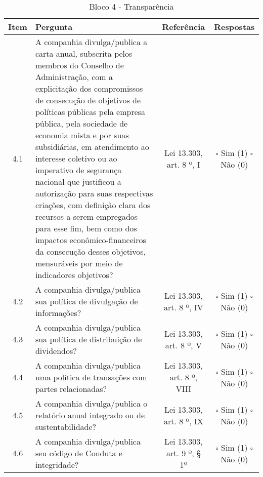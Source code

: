 \begin{center}
\begin{longtable}{c l c c}
\caption{Bloco 4 - Transparência} \label{tab:bloco3} \\
\hline
 Item & Pergunta & Referência & Respostas \\ 
 \hline
4.1 &\parbox[t]{8cm}{A companhia divulga/publica a carta anual, subscrita pelos membros do Conselho de Administração, com a explicitação dos compromissos de consecução de objetivos de políticas públicas pela empresa pública, pela sociedade de economia mista e por suas subsidiárias, em atendimento ao interesse coletivo ou ao imperativo de segurança nacional que justificou a autorização para suas respectivas criações, com definição clara dos recursos a serem empregados para esse fim, bem como dos impactos econômico-financeiros da consecução desses objetivos, mensuráveis por meio de indicadores objetivos?} & \parbox[t]{2cm}{Lei 13.303, art. 8 º, I} & \parbox[t]{2cm}{$\square$ Sim (1) \\ $\square$ Não (0)}\\

4.2 &\parbox[t]{8cm}{A companhia divulga/publica sua política de divulgação de informações?} & \parbox[t]{2cm}{Lei 13.303, art. 8 º, IV} & \parbox[t]{2cm}{$\square$ Sim (1) \\ $\square$ Não (0)}\\

4.3 &\parbox[t]{8cm}{A companhia divulga/publica sua política de distribuição de dividendos?} & \parbox[t]{2cm}{Lei 13.303, art. 8 º, V} & \parbox[t]{2cm}{$\square$ Sim (1) \\ $\square$ Não (0)}\\

4.4 &\parbox[t]{8cm}{A companhia divulga/publica uma política de transações com partes relacionadas?} & \parbox[t]{2cm}{Lei 13.303, art. 8 º, VIII} & \parbox[t]{2cm}{$\square$ Sim (1) \\ $\square$ Não (0)}\\

4.5 &\parbox[t]{8cm}{A companhia divulga/publica o relatório anual integrado ou de sustentabilidade?} & \parbox[t]{2cm}{Lei 13.303, art. 8 º, IX} & \parbox[t]{2cm}{$\square$ Sim (1) \\ $\square$ Não (0)}\\

4.6 &\parbox[t]{8cm}{A companhia divulga/publica seu código de Conduta e integridade?} & \parbox[t]{2cm}{Lei 13.303, art. 9 º, § 1º} & \parbox[t]{2cm}{$\square$ Sim (1) \\ $\square$ Não (0)}\\


\end{longtable}
\end{center}
